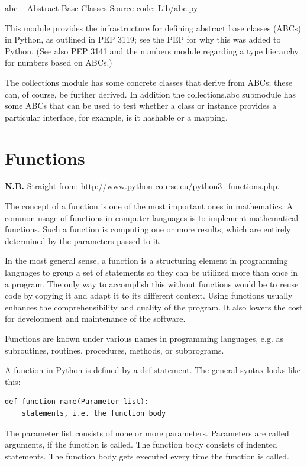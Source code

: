 \documentclass[11pt,a4paper]{article}
\begin{document}
 abc -- Abstract Base Classes
Source code: Lib/abc.py

This module provides the infrastructure for defining abstract base classes (ABCs) in Python, as outlined in PEP 3119; see the PEP for why this was added to Python. (See also PEP 3141 and the numbers module regarding a type hierarchy for numbers based on ABCs.)

The collections module has some concrete classes that derive from ABCs; these can, of course, be further derived. In addition the collections.abc submodule has some ABCs that can be used to test whether a class or instance provides a particular interface, for example, is it hashable or a mapping.




\newpage
\section{Functions}
{\bf N.B.} Straight from: \href{http://www.python-course.eu/python3\_functions.php}{http://www.python-course.eu/python3\_functions.php}. 

The concept of a function is one of the most important ones in
mathematics. A common usage of functions in computer languages is to
implement mathematical functions. Such a function is computing one or
more results, which are entirely determined by the parameters passed
to it.

In the most general sense, a function is a structuring element in
programming languages to group a set of statements so they can be
utilized more than once in a program. The only way to accomplish this
without functions would be to reuse code by copying it and adapt it to
its different context. Using functions usually enhances the
comprehensibility and quality of the program. It also lowers the cost
for development and maintenance of the software.

Functions are known under various names in programming languages,
e.g. as subroutines, routines, procedures, methods, or subprograms.

A function in Python is defined by a def statement. The general syntax looks like this:
\begin{lstlisting}
def function-name(Parameter list):
    statements, i.e. the function body
\end{lstlisting}

The parameter list consists of none or more parameters. Parameters are
called arguments, if the function is called. The function body
consists of indented statements. The function body gets executed every
time the function is called.
\end{document}
